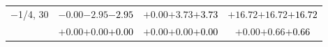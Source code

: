 \documentclass[compress]{beamer}
\begin{document}
\begin{frame}
\begin{tabular}{r | c | c | c}
$-$1/4, 30 & $-0.00$\hspace{0.1 cm}$-2.95$\hspace{0.1 cm}\textcolor{black}{$-2.95$} & $+0.00$\hspace{0.1 cm}$+3.73$\hspace{0.1 cm}\textcolor{black}{$+3.73$} & $+16.72$\hspace{0.1 cm}$+16.72$\hspace{0.1 cm}\textcolor{black}{$+16.72$} \\
           & $+0.00$\hspace{0.1 cm}$+0.00$\hspace{0.1 cm}\textcolor{black}{$+0.00$} & $+0.00$\hspace{0.1 cm}$+0.00$\hspace{0.1 cm}\textcolor{black}{$+0.00$} & $+0.00$\hspace{0.1 cm}$+0.66$\hspace{0.1 cm}\textcolor{black}{$+0.66$} \\
\end{tabular}
\end{frame}
\end{document}
